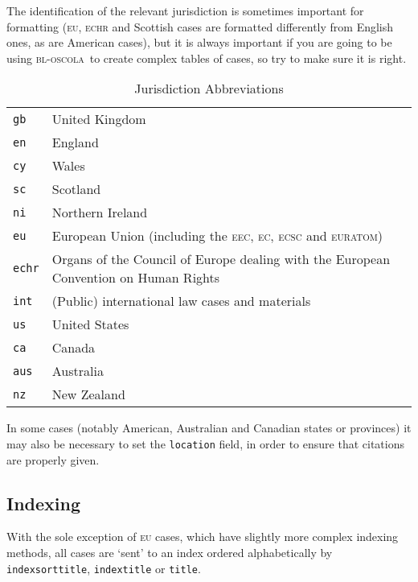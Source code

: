 \documentclass[a5paper,fontsize=9pt,DIV=1]{scrartcl}
\newcommand{\oscola}{\textsc{bl-oscola}}
\begin{document}
The identification of the relevant jurisdiction is sometimes important
for formatting (\textsc{eu}, \textsc{echr} and Scottish cases are
formatted differently from English ones, as are American cases), but
it is always important if you are going to be using \oscola\ to create
complex tables of cases, so try to make sure it is right.

\begin{table}
\centering
{}
\begin{tabular*}{10cm}{l p{8cm}}
\toprule
\texttt{gb}   & United Kingdom \\
\texttt{en}   & England \\
\texttt{cy}   & Wales \\
\texttt{sc}   & Scotland \\
\texttt{ni}   & Northern Ireland \\
\texttt{eu}   & European Union (including the \textsc{eec}, \textsc{ec},
	        \textsc{ecsc} and \textsc{euratom}) \\
\texttt{echr} & Organs of the Council of Europe dealing with the
	        European Convention on Human Rights \\
\texttt{int}  & (Public) international law cases and materials \\
\texttt{us}   & United States \\
\texttt{ca}   & Canada \\
\texttt{aus}  & Australia \\
\texttt{nz}   & New Zealand \\\bottomrule
\end{tabular*}
\caption{Jurisdiction Abbreviations\label{juristable}}
\end{table}

In some cases (notably American, Australian and Canadian states or
provinces) it may also be necessary to set the \texttt{location}
field, in order to ensure that citations are properly given.

\subsection{Indexing}


With the sole exception of \textsc{eu} cases, which have slightly more
complex indexing methods, all cases are `sent' to an index ordered
alphabetically by \texttt{indexsorttitle}, \texttt{indextitle} or
\texttt{title}.
\end{document}
